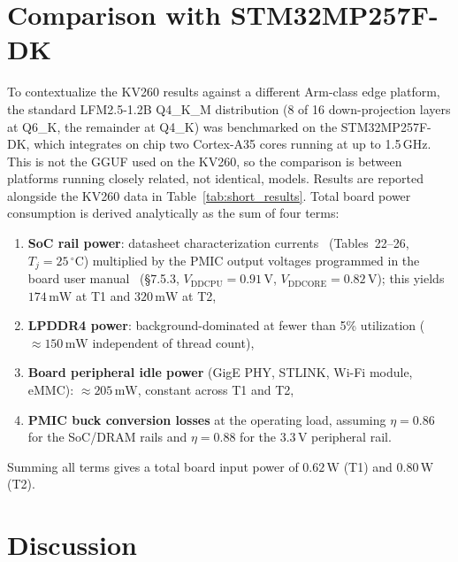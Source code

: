 \section{Comparison with STM32MP257F-DK}
\label{subsec:stm32comparison}

To contextualize the KV260 results against a different Arm-class edge platform, the
standard LFM2.5-1.2B Q4\_K\_M distribution (8 of 16 down-projection layers at Q6\_K, the
remainder at Q4\_K) was benchmarked on the STM32MP257F-DK, which integrates on chip two
Cortex-A35 cores running at up to 1.5\,GHz. This is not the GGUF used on the KV260, so
the comparison is between platforms running closely related, not identical, models.
Results are reported alongside the KV260 data in Table~\ref{tab:short_results}. Total
board power consumption is derived analytically as the sum of four terms:
\begin{enumerate}[label=(\roman*)]
    \item \textbf{SoC rail power}: datasheet characterization currents~\cite{ds14284} (Tables~22--26, $T_j = 25\,^\circ\text{C}$) multiplied by the PMIC output voltages programmed in the board user manual~\cite{um3385} (\S7.5.3, $V_{\text{DDCPU}} = 0.91\,\text{V}$, $V_{\text{DDCORE}} = 0.82\,\text{V}$); this yields $174\,\text{mW}$ at T1 and $320\,\text{mW}$ at T2,
    \item \textbf{LPDDR4 power}: background-dominated at fewer than 5\% utilization ($\approx 150\,\text{mW}$ independent of thread count),
    \item \textbf{Board peripheral idle power} (GigE PHY, STLINK, Wi-Fi module, eMMC): $\approx 205\,\text{mW}$, constant across T1 and T2,
    \item \textbf{PMIC buck conversion losses} at the operating load, assuming $\eta = 0.86$ for the SoC/DRAM rails and $\eta = 0.88$ for the $3.3\,\text{V}$ peripheral rail.
\end{enumerate}
Summing all terms gives a total board input power of $0.62\,\text{W}$ (T1) and
$0.80\,\text{W}$ (T2).

\section{Discussion}
\label{sec:discussion}

